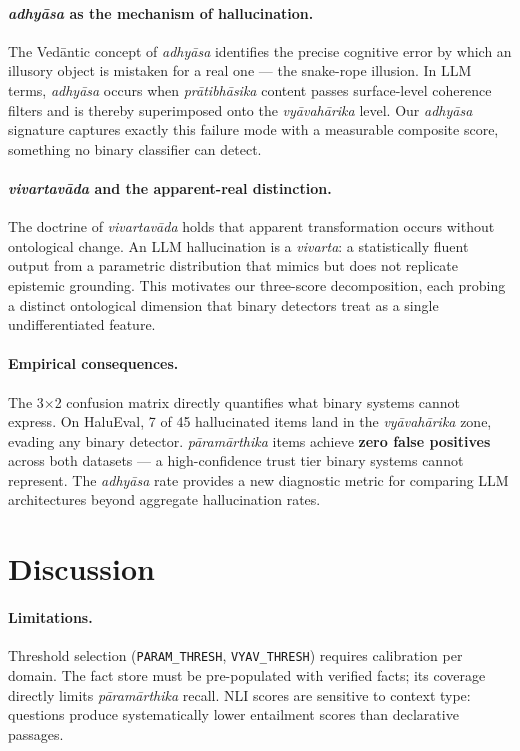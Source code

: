 \documentclass[11pt]{article}
\newcommand{\param}{\textcolor{paramcol}{\textit{pāramārthika}}}
\newcommand{\vyav}{\textcolor{vyavcol}{\textit{vyāvahārika}}}
\newcommand{\prati}{\textcolor{praticol}{\textit{prātibhāsika}}}
\newcommand{\adhyasa}{\textcolor{adhyasacol}{\textit{adhyāsa}}}
\newcommand{\vivarta}{\textit{vivartavāda}}
\begin{document}
\paragraph{\adhyasa{} as the mechanism of hallucination.}
The Vedāntic concept of \adhyasa{} identifies the precise cognitive error by
which an illusory object is mistaken for a real one --- the snake-rope
illusion. In LLM terms, \adhyasa{} occurs when \prati{} content passes
surface-level coherence filters and is thereby superimposed onto the \vyav{}
level. Our \adhyasa{} signature captures exactly this failure mode with a
measurable composite score, something no binary classifier can detect.

\paragraph{\vivarta{} and the apparent-real distinction.}
The doctrine of \vivarta{} holds that apparent transformation occurs without
ontological change. An LLM hallucination is a \textit{vivarta}: a statistically
fluent output from a parametric distribution that mimics but does not replicate
epistemic grounding. This motivates our three-score decomposition, each probing
a distinct ontological dimension that binary detectors treat as a single
undifferentiated feature.

\paragraph{Empirical consequences.}
The 3$\times$2 confusion matrix directly quantifies what binary systems cannot
express. On HaluEval, 7 of 45 hallucinated items land in the \vyav{} zone,
evading any binary detector. \param{} items achieve \textbf{zero false
positives} across both datasets --- a high-confidence trust tier binary systems
cannot represent. The \adhyasa{} rate provides a new diagnostic metric for
comparing LLM architectures beyond aggregate hallucination rates.

\section{Discussion}
\label{sec:disc}

\paragraph{Limitations.}
Threshold selection (\texttt{PARAM\_THRESH}, \texttt{VYAV\_THRESH}) requires
calibration per domain. The fact store must be pre-populated with verified
facts; its coverage directly limits \param{} recall. NLI scores are sensitive
to context type: questions produce systematically lower entailment scores than
declarative passages.
\end{document}
